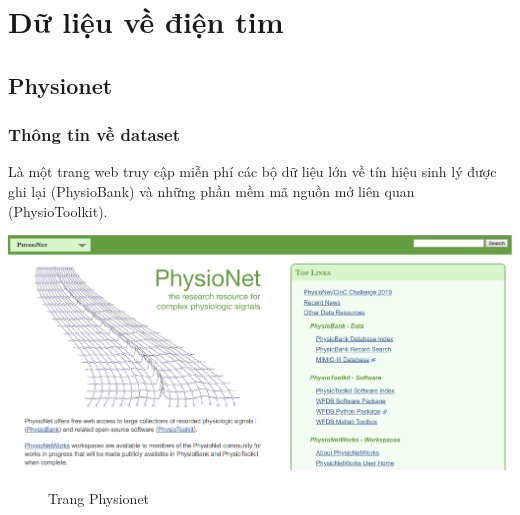 \chapter{Dữ liệu về điện tim}
\newpage

\section{Physionet}
\subsection{Thông tin về dataset}
Là một trang web truy cập miễn phí các bộ dữ liệu lớn về tín hiệu sinh lý được ghi lại (PhysioBank) và những phần mềm mã nguồn mở liên quan (PhysioToolkit).
\begin{center}
    \includegraphics[scale=.3]{image/chapter3/Screenshot_from_2019-03-11_04-58-18.png}
    \begin{figure}[htp]
    \begin{center}
    \end{center}
    \caption{Trang Physionet}
    \end{figure}
\end{center}

